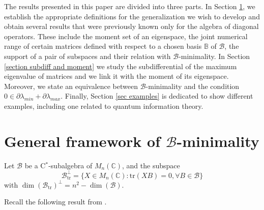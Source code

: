 \documentclass[12pt,a4paper]{article}
\def\calB{\mathcal B}
\def\C{\mathbb C}
\def\tr{\text{tr}}
\numberwithin{equation}{section}
\begin{document}
The results presented in this paper are divided into three parts. 
In Section \ref{sec: grales}, we establish the appropriate definitions for the generalization we wish to develop and obtain several results that were previously known only for the algebra of diagonal operators. These include the moment set of an eigenspace, the joint numerical range of certain matrices defined with respect to a chosen basis $\mathbb{B}$ of $\calB$, the support of a pair of subspaces and their relation with $\calB$-minimality.
In Section \ref{section subdiff and moment} we study the subdifferential of the maximum eigenvalue of matrices and we link it with the moment of its eigenspace. Moreover, we state an equivalence between $\calB$-minimality and the condition $0\in \partial\lambda_{min}+\partial\lambda_{max}$.
Finally, Section \ref{sec examples} is dedicated to show different examples, including one related to quantum information theory.

\section{General framework of $\calB$-minimality}\label{sec: grales}



Let $\calB$ be a C$^*$-subalgebra of $M_n(\C)$, and the subspace
$$
\mathcal{B}_{\tr}^\perp=\{X\in M_n(\C):\tr(XB)=0, \forall B\in\calB\}
$$
with $\dim(\calB_{\tr})^\perp=n^2-\dim(\calB)$.

Recall the following result from \cite[Proposition 2.3, Lemma 2.5 and Theorem 2.6]{zhang-jiang-han-matrices}.
\end{document}
